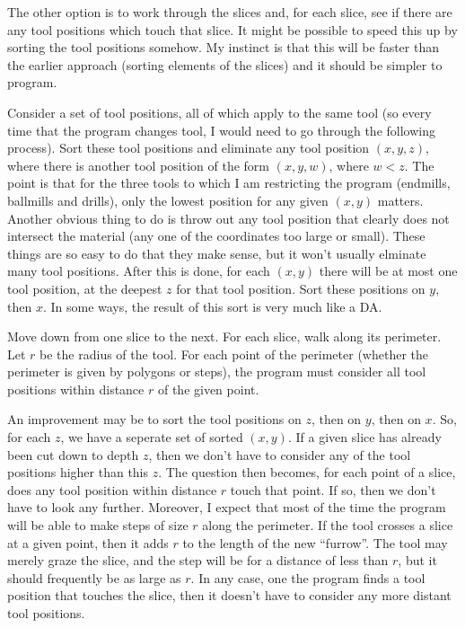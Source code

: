 \documentclass[titlepage,oneside,10pt]{article}
\begin{document}
The other option is to work through the slices and, for each slice,
see if there are any tool positions which touch that slice. It might
be possible to speed this up by sorting the tool positions
somehow. My instinct is that this will be faster than the earlier
approach (sorting elements of the slices) and it should be simpler to
program. 

Consider a set of tool positions, all of which apply to the same
tool (so every time that the program changes tool, I would need to go
through the following process). Sort these tool positions and
eliminate any tool position $(x,y,z)$, where there is another tool
position of the form $(x,y,w)$, where $w < z$. The point is that for
the three tools to which I am restricting the program (endmills,
ballmills and drills), only the lowest position for any given $(x,y)$
matters. Another obvious thing to do is throw out any tool position
that clearly does not intersect the material (any one of the
coordinates too large or small). These things are so easy to do that
they make sense, but it won't usually elminate many tool
positions. After this is done, for each $(x,y)$ there will be at most
one tool position, at the deepest $z$ for that tool
position. Sort these positions on $y$, then $x$. In some ways, the
result of this sort is very much like a DA. 

Move down from one slice to the next. For each slice, walk along its
perimeter. Let $r$ be the radius of the tool. For each point of the
perimeter (whether the perimeter is given by polygons or steps), the
program must consider all tool positions within distance $r$ of the
given point. 

An improvement may be to sort the tool positions on $z$, then on $y$,
then on $x$. So, for each $z$, we have a seperate set of sorted
$(x,y)$. If a given slice has already been cut down to depth $z$, then
we don't have to consider any of the tool positions higher than this
$z$. The question then becomes, for each point of a slice, does any
tool position within distance $r$ touch that point. If so, then we
don't have to look any further. Moreover, I expect that most of the
time the program will be able to make steps of size $r$ along the
perimeter. If the tool crosses a slice at a given point, then it adds
$r$ to the length of the new ``furrow''. The tool may merely graze the
slice, and the step will be for a distance of less than $r$, but it
should frequently be as large as $r$. In any case, one the program finds
a tool position that touches the slice, then it doesn't have to consider
any more distant tool positions.
\end{document}
